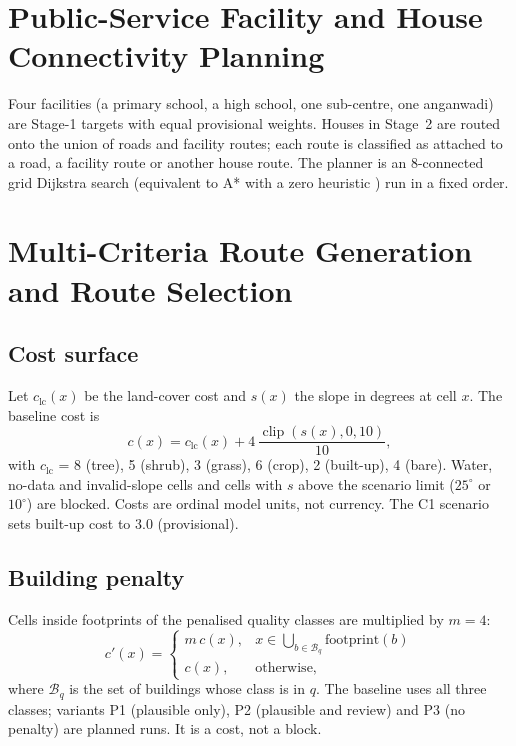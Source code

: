 \documentclass[12pt,a4paper]{report}
\begin{document}
\section{Public-Service Facility and House Connectivity Planning}
Four facilities (a primary school, a high school, one sub-centre, one anganwadi) are Stage-1 targets with equal provisional weights. Houses in Stage~2 are routed onto the union of roads and facility routes; each route is classified as attached to a road, a facility route or another house route. The planner is an 8-connected grid Dijkstra search \cite{F02} (equivalent to A* with a zero heuristic \cite{F01}) run in a fixed order.

\section{Multi-Criteria Route Generation and Route Selection}
\subsection{Cost surface}
Let $c_{\text{lc}}(x)$ be the land-cover cost and $s(x)$ the slope in degrees at cell $x$. The baseline cost is
\begin{equation}\label{eq:cost}
c(x)=c_{\text{lc}}(x)+4\,\frac{\operatorname{clip}(s(x),0,10)}{10},
\end{equation}
with $c_{\text{lc}}$ = 8 (tree), 5 (shrub), 3 (grass), 6 (crop), 2 (built-up), 4 (bare). Water, no-data and invalid-slope cells and cells with $s$ above the scenario limit ($25^{\circ}$ or $10^{\circ}$) are blocked. Costs are ordinal model units, not currency. The C1 scenario sets built-up cost to 3.0 (provisional).

\subsection{Building penalty}
Cells inside footprints of the penalised quality classes are multiplied by $m=4$:
\begin{equation}\label{eq:pen}
c'(x)=\begin{cases}m\,c(x), & x\in\bigcup_{b\in\mathcal{B}_{q}}\text{footprint}(b)\\ c(x), & \text{otherwise,}\end{cases}
\end{equation}
where $\mathcal{B}_q$ is the set of buildings whose class is in $q$. The baseline uses all three classes; variants P1 (plausible only), P2 (plausible and review) and P3 (no penalty) are planned runs. It is a cost, not a block.
\end{document}
